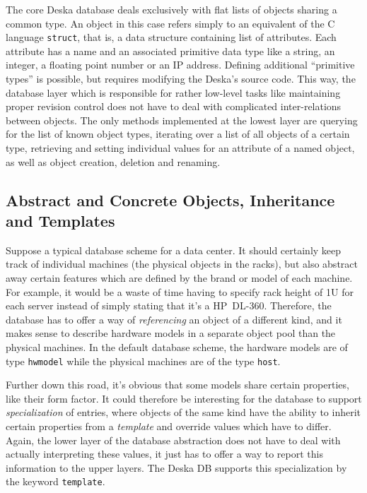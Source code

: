 \documentclass[a4paper]{jpconf}
\begin{document}
The core Deska database deals exclusively with flat lists of objects sharing a common type.  An object in this case refers simply to an
equivalent of the C language {\tt struct}, that is, a data structure containing list of attributes.  Each attribute has a name and an
associated primitive data type like a string, an integer, a floating point number or an IP address.  Defining additional ``primitive
types'' is possible, but requires modifying the Deska's source code.  This way, the database layer which is responsible for rather
low-level tasks like maintaining proper revision control does not have to deal with complicated inter-relations between objects.  The
only methods implemented at the lowest layer are querying for the list of known object types, iterating over a list of all objects of a
certain type, retrieving and setting individual values for an attribute of a named object, as well as object creation, deletion and
renaming.

\subsection{Abstract and Concrete Objects, Inheritance and Templates}

Suppose a typical database scheme for a data center.  It should certainly keep track of individual machines (the physical objects in
the racks), but also abstract away certain features which are defined by the brand or model of each machine.  For example, it would be
a waste of time having to specify rack height of 1U for each server instead of simply stating that it's a HP~DL-360.  Therefore, the
database has to offer a way of {\em referencing} an object of a different kind, and it makes sense to describe hardware models in a
separate object pool than the physical machines.  In the default database scheme, the hardware models are of type {\tt hwmodel} while
the physical machines are of the type {\tt host}.

Further down this road, it's obvious that some models share certain properties, like their form factor.  It could therefore be
interesting for the database to support {\em specialization} of entries, where objects of the same kind have the ability to inherit
certain properties from a {\em template} and override values which have to differ.  Again, the lower layer of the database abstraction
does not have to deal with actually interpreting these values, it just has to offer a way to report this information to the upper
layers.  The Deska DB supports this specialization by the keyword {\tt template}.
\end{document}
